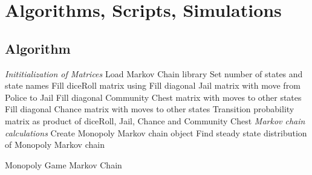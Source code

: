 \documentclass[12pt]{article}
\begin{document}
\section*{Algorithms, Scripts, Simulations}

\subsection*{Algorithm}
\begin{algorithm}[H]
  \DontPrintSemicolon
  \BlankLine
  

  \BlankLine
    
  \emph{Inititialization of Matrices}\;
  Load Markov Chain library\;
  Set number of states and state names\;
  Fill diceRoll matrix using \Frotvec\;
  Fill diagonal Jail matrix with move from Police to Jail\;
  Fill diagonal Community Chest matrix with moves to other states\;
  Fill diagonal Chance matrix with moves to other states\;
  Transition probability matrix as product of diceRoll, Jail, Chance
  and Community Chest\;
\emph{Markov chain calculations}\;
  Create Monopoly Markov chain object\;
  Find steady state distribution of Monopoly Markov chain\;
  \caption{Monopoly Game Markov Chain}
\end{algorithm}
\end{document}
